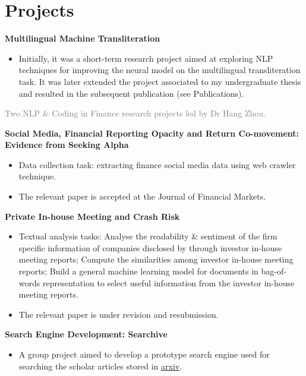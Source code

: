 \documentclass[%
               doublesided,
               paper=a4,
               fontsize=11pt
              ]{my-resume}
\begin{document}
\section{Projects}

\textbf{Multilingual Machine Transliteration}
\smallskip
\begin{itemize}
\item Initially, it was a short-term research project aimed at exploring NLP techniques for improving the neural model on the multilingual transliteration task. It was later extended the project associated to my undergraduate thesis and resulted in the subsequent publication (see Publications).
\end{itemize}
\divider

\textcolor{gray}{Two NLP \& Coding in Finance research projects led by Dr Hang Zhou.}
\smallskip

\textbf{Social Media, Financial Reporting Opacity and Return Co-movement: Evidence from Seeking Alpha}
\smallskip
\begin{itemize}
    \item Data collection task: extracting finance social media data using web crawler technique.
    \item The relevant paper is accepted at the Journal of Financial Markets.
\end{itemize}
\smallskip

\textbf{Private In-house Meeting and Crash Risk}
\begin{itemize}
    \item Textual analysis tasks:  Analyse the readability \& sentiment of the firm specific information of companies disclosed by through investor in-house meeting reports; 
     Compute the similarities among investor in-house meeting reports;
     Build a general machine learning model for documents in bag-of-words representation to select useful information from the investor in-house meeting reports.
    \item The relevant paper is under revision and resubmission.
\end{itemize}
\divider

\textbf{Search Engine Development: Searchive}
\smallskip
\begin{itemize}
    \item A group project aimed to develop a prototype search engine used for searching the scholar articles stored in \href{https://arxiv.org/}{arxiv}. 
\end{itemize}
\divider
\end{document}

